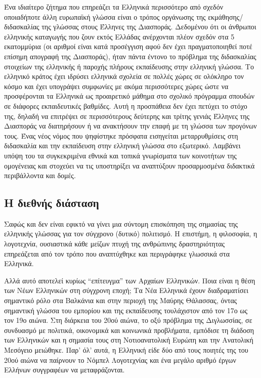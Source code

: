\documentclass[]{../../metanetpaper}
\begin{document}
\begin{multicols}{2}
Ένα ιδιαίτερο ζήτημα που επηρεάζει τα Ελληνικά περισσότερο από σχεδόν οποιαδήποτε άλλη ευρωπαϊκή γλώσσα είναι ο τρόπος οργάνωσης της εκμάθησης/διδασκαλίας της γλώσσας στους Έλληνες της Διασποράς. Δεδομένου ότι οι άνθρωποι ελληνικής καταγωγής που ζουν εκτός Ελλάδας ανέρχονται πλέον σχεδόν στα 5 εκατομμύρια (οι αριθμοί είναι κατά προσέγγιση αφού δεν έχει πραγματοποιηθεί ποτέ επίσημη απογραφή της Διασποράς), ήταν πάντα έντονο το πρόβλημα της διδασκαλίας  στοιχείων της ελληνικής ή παροχής πλήρους εκπαίδευσης στην ελληνική γλώσσα. Το ελληνικό κράτος έχει ιδρύσει ελληνικά σχολεία σε πολλές χώρες σε ολόκληρο τον κόσμο και έχει υπογράψει συμφωνίες με ακόμα περισσότερες χώρες ώστε να  προσφέρονται τα Ελληνικά ως προαιρετικό μάθημα στο σχολικό πρόγραμμα σπουδών σε διάφορες εκπαιδευτικές βαθμίδες. Αυτή η προσπάθεια δεν έχει πετύχει το στόχο της, δηλαδή να επιτρέψει σε περισσότερους δεύτερης και τρίτης γενιάς Έλληνες της Διασποράς να διατηρήσουν ή να ανακτήσουν την επαφή με τη γλώσσα των προγόνων τους. Ένας νέος νόμος που ψηφίστηκε πρόσφατα εισηγείται μεταρρυθμίσεις στη διδασκαλία και την εκπαίδευση στην ελληνική γλώσσα στο εξωτερικό. Λαμβάνει υπόψη του τα συγκεκριμένα εθνικά και τοπικά γνωρίσματα των κοινοτήτων της ομογένειας και στοχεύει να τις υποστηρίξει να αναπτύξουν προσαρμοσμένα διδακτικά περιβάλλοντα και δομές.

\subsection{Η διεθνής διάσταση}

Σαφώς και δεν είναι εφικτό να γίνει μια σύντομη επισκόπηση της σημασίας της ελληνικής γλώσσας για τον σύγχρονο (δυτικό) πολιτισμό. Η επιστήμη, η φιλοσοφία, η λογοτεχνία, ουσιαστικά κάθε μείζων πτυχή της ανθρώπινης δραστηριότητας επηρεάζεται από τον τρόπο που αναπτύχθηκε και περιγράφηκε γλωσσικά στα Ελληνικά.

Αλλά αυτό αποτελεί κυρίως “επίτευγμα” των Αρχαίων Ελληνικών. Ποια είναι η θέση των Νέων Ελληνικών στη σύγχρονη εποχή; Τα Νέα Ελληνικά έχουν διαδραματίσει σημαντικό ρόλο στα Βαλκάνια και στην περιοχή της Μαύρης Θάλασσας, όντας σημαντική γλώσσα του εμπορίου και της εκπαίδευσης τουλάχιστον από τον 17ο ως τον 19ο αιώνα. Στη διάρκεια του 20ού αιώνα, το οξύ πρόβλημα της Διγλωσσίας, σε συνδυασμό με πολιτικά, οικονομικά και κοινωνικά προβλήματα, εμπόδισε τη διάδοση των Ελληνικών και η σημασία τους στη Νοτιοανατολική Ευρώπη και την Ανατολική Μεσόγειο μειώθηκε. Παρ' όλ' αυτά, η Ελληνική είδε δύο από τους ποιητές της του 20ού αιώνα να παίρνουν το Νόμπελ Λογοτεχνίας και ένα μεγάλο αριθμό έργων Ελλήνων συγγραφέων να μεταφράζονται.


\end{multicols}
\end{document}
